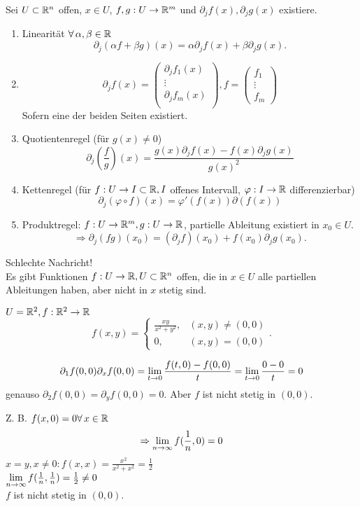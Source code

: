 \documentclass[../ana2.tex]{subfiles}
\begin{document}
\begin{lem}
    Sei \( U \subset \mathbb{R}^n \) offen, \( x\in U \), 
    \( f,g:U\rightarrow \mathbb{R}^m \) und 
    \( \partial_j f(x), \partial_j g(x) \) existiere.
    \begin{enumerate}
        \item Linearität \( \forall \alpha, \beta \in \R \)
        \[ \partial_j (\alpha f + \beta g)(x) 
        = \alpha \partial_j f(x) + \beta \partial_j g(x). \]
        \item \[ \partial_j f(x) = \left(\begin{array}{c}
            \partial_j f_1(x) \\
            \vdots \\
            \partial_j f_m(x) \\
        \end{array}\right), 
        f = \left( \begin{array}{c}
            f_1\\
            \vdots \\
            f_m           
        \end{array} \right) \]
        Sofern eine der beiden Seiten existiert.
        \item Quotientenregel (für \( g(x) \neq 0 \))
        \[ \partial_j (\frac{f}{g})(x) 
        = \frac{g(x) \partial_j f(x) - f(x) \partial_j g(x)}{g(x)^2} \]
        \item Kettenregel (für \( f:U\rightarrow I \subset \mathbb{R}, 
        I \) offenes Intervall, 
        \( \varphi:I\rightarrow \mathbb{R} \) differenzierbar)
        \[ \partial_j (\varphi \circ f)(x) 
        = \varphi'(f(x)) \partial(f(x)) \]
        \item Produktregel: \( f:U\rightarrow \mathbb{R}^m, 
        g:U\rightarrow \mathbb{R} \), partielle Ableitung 
        existiert in \( x_0 \in U \).
        \[ \Rightarrow \partial_j(fg)(x_0) 
        = (\partial_j f)(x_0) + f(x_0) \partial_j g(x_0). \]
    \end{enumerate}
\end{lem}
Schlechte Nachricht!\\
Es gibt Funktionen \( f:U\rightarrow \mathbb{R}, U \subset \mathbb{R}^n \) offen, 
die in \( x\in U \) alle partiellen Ableitungen haben, 
aber nicht in \( x \) stetig sind.
\begin{bsp}
    \( U = \mathbb{R}^2, f:\mathbb{R}^2\rightarrow \mathbb{R} \)
    \[ f(x,y) = \begin{cases}
        \frac{xy}{x^2 + y^2}, &(x,y) \neq (0,0)\\
        0, &(x,y) = (0,0)
    \end{cases}. \]

    \[ \partial_1 f(0,0) \partial_x f(0,0) 
    = \lim\limits_{t\rightarrow{}0} \frac{f(t,0) - f(0,0)}{t} 
    = \lim\limits_{t\rightarrow{}0} \frac{0 - 0}{t} = 0 \]
    genauso \( \partial_2 f(0,0) = \partial_y f(0,0) = 0 \).
    Aber \(f\) ist nicht stetig in \( (0,0) \).

    Z. B. \( f(x,0) = 0 \forall x \in \R \)
    \[ \Rightarrow \lim\limits_{n\rightarrow\infty} f(\frac{1}{n},0) = 0 \]
    \( x=y, x \neq 0: f(x,x) = \frac{x^2}{x^2 + x^2} = \frac{1}{2} \) \\
    \( \lim\limits_{n\rightarrow\infty} f(\frac{1}{n}, \frac{1}{n}) = \frac{1}{2} \neq 0 \) \\
    \( f \) ist nicht stetig in \( (0,0) \).
\end{bsp}
\end{document}

